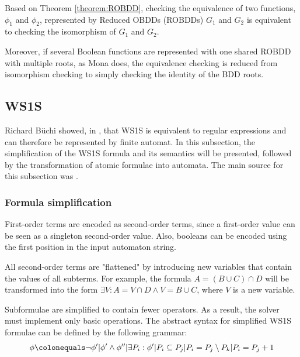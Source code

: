 \documentclass[pdflatex,sn-mathphys-num]{sn-jnl}%
\theoremstyle{thmstyleone}%
\theoremstyle{thmstyletwo}%
\theoremstyle{thmstylethree}%
\begin{document}
        \vspace*{0.5em}

        Based on Theorem \ref{theorem:ROBDD}, checking the equivalence of two functions, $\phi_1$ and $\phi_2$, represented by Reduced OBDDs (ROBDDs) $G_1$ and $G_2$ is equivalent to checking the isomorphism of $G_1$ and $G_2$.

        Moreover, if several Boolean functions are represented with one shared ROBDD with multiple roots, as Mona does, the equivalence checking is reduced from isomorphism checking to simply checking the identity of the BDD roots.


    \subsection{WS1S}
        Richard Büchi showed, in \cite{Buchi}, that WS1S is equivalent to regular expressions and can therefore be represented by finite automat. In this subsection, the simplification of the WS1S formula and its semantics will be presented, followed by the transformation of atomic formulae into automata. The main source for this subsection was \cite{Mona_manual}.

        \subsubsection*{Formula simplification}
            First-order terms are encoded as second-order terms, since a first-order value can be seen as a singleton second-order value. Also, booleans can be encoded using the first position in the input automaton string.

            All second-order terms are "flattened" by introducing new variables that contain the values of all subterms. For example, the formula $A = (B \cup C) \cap D$ will be transformed into the form $\exists V : A = V \cap D \land V = B \cup C$, where $V$ is a new variable.

            Subformulae are simplified to contain fewer operators. As a result, the solver must implement only basic operations. The abstract syntax for simplified WS1S formulae can be defined by the following grammar:
            $$
                \phi \colonequals \neg \phi' | \phi' \land \phi'' | \exists P_i : \phi' | P_i \subseteq P_j | P_i = P_j \setminus P_k | P_i = P_j + 1
            $$
\end{document}
